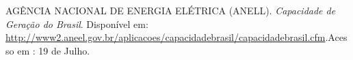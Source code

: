 \documentclass[12pt,fleqn]{article}
\begin{document}
\renewcommand{\refname}{REFER\^ENCIAS}

\begin{thebibliography}{99}
\fontsize{11}{0}\selectfont
{}
  AG\^ENCIA NACIONAL DE ENERGIA EL\'ETRICA (ANELL).
  {\em  Capacidade de Gera\c c\~ao do Brasil}.
  Dispon\'ivel em: \url {http://www2.aneel.gov.br/aplicacoes/capacidadebrasil/capacidadebrasil.cfm}.Acesso em : 19 de Julho.

\end{thebibliography}
\vspace*{-0.1cm}






\end{document}
